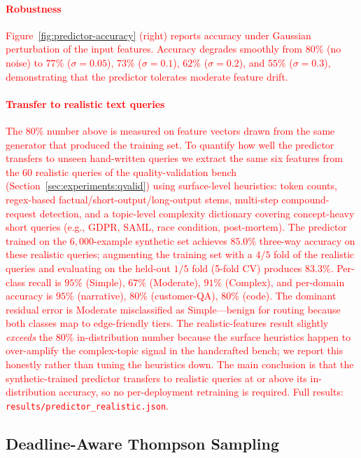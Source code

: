 \documentclass[final,3p,twocolumn,authoryear]{elsarticle}
\newcommand{\rev}[1]{\textcolor{red}{#1}}
\theoremstyle{plain}
\theoremstyle{definition}
\begin{document}
\rev{\paragraph{Robustness}
Figure~\ref{fig:predictor-accuracy} (right) reports accuracy under Gaussian perturbation of the input features. Accuracy degrades smoothly from $80\%$ (no noise) to $77\%$ ($\sigma{=}0.05$), $73\%$ ($\sigma{=}0.1$), $62\%$ ($\sigma{=}0.2$), and $55\%$ ($\sigma{=}0.3$), demonstrating that the predictor tolerates moderate feature drift.}

\rev{\paragraph{Transfer to realistic text queries}
The $80\%$ number above is measured on feature vectors drawn from the same generator that produced the training set. To quantify how well the predictor transfers to unseen hand-written queries we extract the same six features from the $60$ realistic queries of the quality-validation bench (Section~\ref{sec:experiments:qvalid}) using surface-level heuristics: token counts, regex-based factual/short-output/long-output stems, multi-step compound-request detection, and a topic-level complexity dictionary covering concept-heavy short queries (e.g., GDPR, SAML, race condition, post-mortem). The predictor trained on the $6{,}000$-example synthetic set achieves $85.0\%$ three-way accuracy on these realistic queries; augmenting the training set with a $4/5$ fold of the realistic queries and evaluating on the held-out $1/5$ fold (5-fold CV) produces $83.3\%$. Per-class recall is $95\%$ (Simple), $67\%$ (Moderate), $91\%$ (Complex), and per-domain accuracy is $95\%$ (narrative), $80\%$ (customer-QA), $80\%$ (code). The dominant residual error is Moderate misclassified as Simple---benign for routing because both classes map to edge-friendly tiers. The realistic-features result slightly \emph{exceeds} the $80\%$ in-distribution number because the surface heuristics happen to over-amplify the complex-topic signal in the handcrafted bench; we report this honestly rather than tuning the heuristics down. The main conclusion is that the synthetic-trained predictor transfers to realistic queries at or above its in-distribution accuracy, so no per-deployment retraining is required. Full results: \texttt{results/predictor\_realistic.json}.}

\subsection{Deadline-Aware Thompson Sampling}
\end{document}
